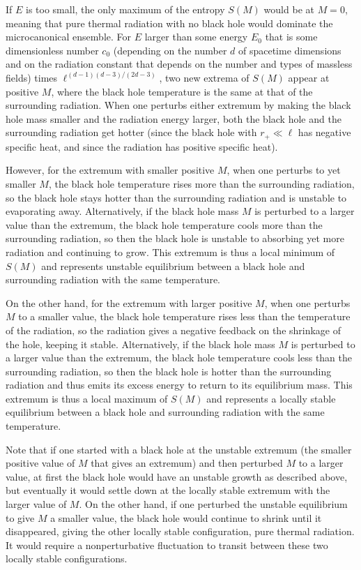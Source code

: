 \documentclass[12pt]{article} \usepackage{latexsym}
\begin{document}
If $E$ is too small, the only maximum of the entropy $S(M)$ would be at
$M=0$, meaning that pure thermal radiation with no black hole would
dominate the microcanonical ensemble.  For $E$ larger than some energy
$E_0$ that is some dimensionless number $c_0$ (depending on the number
$d$ of spacetime dimensions and on the radiation constant that depends
on the number and types of massless fields) times
$\ell^{(d-1)(d-3)/(2d-3)}$, two new extrema of $S(M)$ appear at
positive $M$, where the black hole temperature is the same at that of
the surrounding radiation.  When one perturbs either extremum by making
the black hole mass smaller and the radiation energy larger, both the
black hole and the surrounding radiation get hotter (since the black
hole with $r_+ \ll \ell$ has negative specific heat, and since the
radiation has positive specific heat).

However, for the extremum with smaller positive $M$, when one perturbs
to yet smaller $M$, the black hole temperature rises more than the
surrounding radiation, so the black hole stays hotter than the
surrounding radiation and is unstable to evaporating away. 
Alternatively, if the black hole mass $M$ is perturbed to a larger
value than the extremum, the black hole temperature cools more than the
surrounding radiation, so then the black hole is unstable to absorbing
yet more radiation and continuing to grow.  This extremum is thus a
local minimum of $S(M)$ and represents unstable equilibrium between a
black hole and surrounding radiation with the same temperature.

On the other hand, for the extremum with larger positive $M$, when one
perturbs $M$ to a smaller value, the black hole temperature rises less
than the temperature of the radiation, so the radiation gives a
negative feedback on the shrinkage of the hole, keeping it stable. 
Alternatively, if the black hole mass $M$ is perturbed to a larger
value than the extremum, the black hole temperature cools less than the
surrounding radiation, so then the black hole is hotter than the
surrounding radiation and thus emits its excess energy to return to its
equilibrium mass.  This extremum is thus a local maximum of $S(M)$ and
represents a locally stable equilibrium between a black hole and
surrounding radiation with the same temperature.

Note that if one started with a black hole at the unstable extremum
(the smaller positive value of $M$ that gives an extremum) and then
perturbed $M$ to a larger value, at first the black hole would have an
unstable growth as described above, but eventually it would settle down
at the locally stable extremum with the larger value of $M$.  On the
other hand, if one perturbed the unstable equilibrium to give $M$ a
smaller value, the black hole would continue to shrink until it
disappeared, giving the other locally stable configuration, pure
thermal radiation.  It would require a nonperturbative fluctuation to
transit between these two locally stable configurations.
\end{document}
